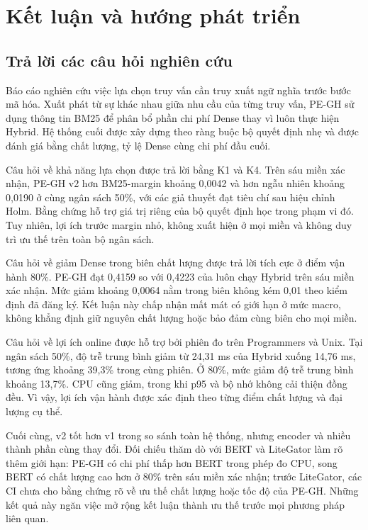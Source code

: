 \chapter{Kết luận và hướng phát triển}
\label{chap:conclusion}

\section{Trả lời các câu hỏi nghiên cứu}
Báo cáo nghiên cứu việc lựa chọn truy vấn cần truy xuất ngữ nghĩa trước bước mã hóa. Xuất phát từ sự khác nhau giữa nhu cầu của từng truy vấn, PE-GH sử dụng thông tin BM25 để phân bổ phần chi phí Dense thay vì luôn thực hiện Hybrid. Hệ thống cuối được xây dựng theo ràng buộc bộ quyết định nhẹ và được đánh giá bằng chất lượng, tỷ lệ Dense cùng chi phí đầu cuối.

Câu hỏi về khả năng lựa chọn được trả lời bằng K1 và K4. Trên sáu miền xác nhận, PE-GH v2 hơn BM25-margin khoảng 0,0042 và hơn ngẫu nhiên khoảng 0,0190 \ndcg{} ở cùng ngân sách 50\%, với các giả thuyết đạt tiêu chí sau hiệu chỉnh Holm. Bằng chứng hỗ trợ giá trị riêng của bộ quyết định học trong phạm vi đó. Tuy nhiên, lợi ích trước margin nhỏ, không xuất hiện ở mọi miền và không duy trì ưu thế trên toàn bộ ngân sách.

Câu hỏi về giảm Dense trong biên chất lượng được trả lời tích cực ở điểm vận hành 80\%. PE-GH đạt 0,4159 so với 0,4223 của luôn chạy Hybrid trên sáu miền xác nhận. Mức giảm khoảng 0,0064 nằm trong biên không kém 0,01 theo kiểm định đã đăng ký. Kết luận này chấp nhận mất mát có giới hạn ở mức macro, không khẳng định giữ nguyên chất lượng hoặc bảo đảm cùng biên cho mọi miền.

Câu hỏi về lợi ích online được hỗ trợ bởi phiên đo trên Programmers và Unix. Tại ngân sách 50\%, độ trễ trung bình giảm từ 24,31 ms của Hybrid xuống 14,76 ms, tương ứng khoảng 39,3\% trong cùng phiên. Ở 80\%, mức giảm độ trễ trung bình khoảng 13,7\%. CPU cũng giảm, trong khi p95 và bộ nhớ không cải thiện đồng đều. Vì vậy, lợi ích vận hành được xác định theo từng điểm chất lượng và đại lượng cụ thể.

Cuối cùng, v2 tốt hơn v1 trong so sánh toàn hệ thống, nhưng encoder và nhiều thành phần cùng thay đổi. Đối chiếu thăm dò với BERT và LiteGator làm rõ thêm giới hạn: PE-GH có chi phí thấp hơn BERT trong phép đo CPU, song BERT có chất lượng cao hơn ở 80\% trên sáu miền xác nhận; trước LiteGator, các CI chưa cho bằng chứng rõ về ưu thế chất lượng hoặc tốc độ của PE-GH. Những kết quả này ngăn việc mở rộng kết luận thành ưu thế trước mọi phương pháp liên quan.

